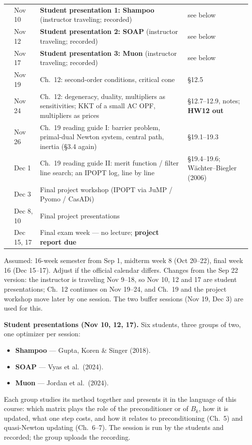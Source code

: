 \documentclass[10pt,a4paper]{article}
\newcommand{\hw}[1]{\textbf{#1}}
\begin{document}
\begin{longtable}{@{}>{\raggedright\arraybackslash}p{7mm}>{\raggedright\arraybackslash}p{18mm}>{\raggedright\arraybackslash}p{86mm}>{\raggedright\arraybackslash}p{47mm}@{}}
\midrule
11 & Nov 10 & \textbf{Student presentation 1: Shampoo} (instructor traveling; recorded) & see below\\
 & Nov 12 & \textbf{Student presentation 2: SOAP} (instructor traveling; recorded) & see below\\
12 & Nov 17 & \textbf{Student presentation 3: Muon} (instructor traveling; recorded) & see below\\
 & Nov 19 & Ch.~12: second-order conditions, critical cone & \S12.5\\
13 & Nov 24 & Ch.~12: degeneracy, duality, multipliers as sensitivities; KKT of a small AC OPF,
  multipliers as prices & \S12.7--12.9, notes; \hw{HW12 out}\\
 & Nov 26 & Ch.~19 reading guide I: barrier problem, primal-dual Newton system, central path,
  inertia (\S3.4 again) & \S19.1--19.3\\
14 & Dec 1 & Ch.~19 reading guide II: merit function / filter line search; an IPOPT log, line by line
  & \S19.4--19.6; W\"achter--Biegler (2006)\\
 & Dec 3 & Final project workshop (IPOPT via JuMP / Pyomo / CasADi) & \\
15 & Dec 8, 10 & Final project presentations & \\
16 & Dec 15, 17 & Final exam week --- no lecture; \textbf{project report due} & \\
\bottomrule
\end{longtable}

{\small Assumed: 16-week semester from Sep 1, midterm week 8 (Oct 20--22), final week 16 (Dec 15--17).
Adjust if the official calendar differs. Changes from the Sep 22 version: the instructor is traveling
Nov 9--18, so Nov 10, 12 and 17 are student presentations; Ch.~12 continues on Nov 19--24, and Ch.~19 and the
project workshop move later by one session. The two buffer sessions (Nov 19, Dec 3) are used for this.}

\textbf{Student presentations (Nov 10, 12, 17).} Six students, three groups of two, one optimizer per session:
\begin{itemize}[leftmargin=*,itemsep=0.1em]
  \item \textbf{Shampoo} --- Gupta, Koren \& Singer (2018).
  \item \textbf{SOAP} --- Vyas et al.\ (2024).
  \item \textbf{Muon} --- Jordan et al.\ (2024).
\end{itemize}
Each group studies its method together and presents it in the language of this course: which matrix plays the
role of the preconditioner or of $B_k$, how it is updated, what one step costs, and how it relates to
preconditioning (Ch.~5) and quasi-Newton updating (Ch.~6--7). The session is run by the students and
recorded; the group uploads the recording.
\end{document}
